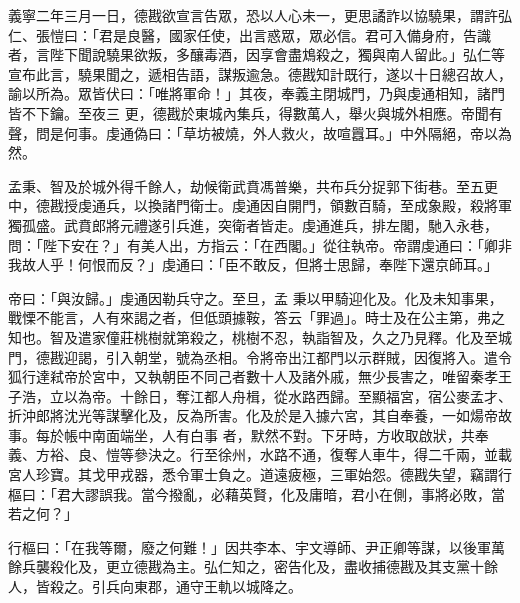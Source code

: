 \begin{pinyinscope}
 義寧二年三月一日，德戡欲宣言告眾，恐以人心未一，更思譎詐以協驍果，謂許弘仁、張愷曰：「君是良醫，國家任使，出言惑眾，眾必信。君可入備身府，告識者，言陛下聞說驍果欲叛，多釀毒酒，因享會盡鴆殺之，獨與南人留此。」弘仁等宣布此言，驍果聞之，遞相告語，謀叛逾急。德戡知計既行，遂以十日總召故人，諭以所為。眾皆伏曰：「唯將軍命！」其夜，奉義主閉城門，乃與虔通相知，諸門皆不下鑰。至夜三
 更，德戡於東城內集兵，得數萬人，舉火與城外相應。帝聞有聲，問是何事。虔通偽曰：「草坊被燒，外人救火，故喧囂耳。」中外隔絕，帝以為然。



 孟秉、智及於城外得千餘人，劫候衛武賁馮普樂，共布兵分捉郭下街巷。至五更中，德戡授虔通兵，以換諸門衛士。虔通因自開門，領數百騎，至成象殿，殺將軍獨孤盛。武賁郎將元禮遂引兵進，突衛者皆走。虔通進兵，排左閣，馳入永巷，問：「陛下安在？」有美人出，方指云：「在西閣。」從往執帝。帝謂虔通曰：「卿非我故人乎！何恨而反？」虔通曰：「臣不敢反，但將士思歸，奉陛下還京師耳。」



 帝曰：「與汝歸。」虔通因勒兵守之。至旦，孟
 秉以甲騎迎化及。化及未知事果，戰慄不能言，人有來謁之者，但低頭據鞍，答云「罪過」。時士及在公主第，弗之知也。智及遣家僮莊桃樹就第殺之，桃樹不忍，執詣智及，久之乃見釋。化及至城門，德戡迎謁，引入朝堂，號為丞相。令將帝出江都門以示群賊，因復將入。遣令狐行達弒帝於宮中，又執朝臣不同己者數十人及諸外戚，無少長害之，唯留秦孝王子浩，立以為帝。十餘日，奪江都人舟楫，從水路西歸。至顯福宮，宿公麥孟才、折沖郎將沈光等謀擊化及，反為所害。化及於是入據六宮，其自奉養，一如煬帝故事。每於帳中南面端坐，人有白事
 者，默然不對。下牙時，方收取啟狀，共奉義、方裕、良、愷等參決之。行至徐州，水路不通，復奪人車牛，得二千兩，並載宮人珍寶。其戈甲戎器，悉令軍士負之。道遠疲極，三軍始怨。德戡失望，竊謂行樞曰：「君大謬誤我。當今撥亂，必藉英賢，化及庸暗，君小在側，事將必敗，當若之何？」



 行樞曰：「在我等爾，廢之何難！」因共李本、宇文導師、尹正卿等謀，以後軍萬餘兵襲殺化及，更立德戡為主。弘仁知之，密告化及，盡收捕德戡及其支黨十餘人，皆殺之。引兵向東郡，通守王軌以城降之。




\end{pinyinscope}
